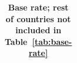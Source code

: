 {\begin{table}[ht]
{\begin{tabular}{lccccc}
        \bottomrule
        \end{tabular}
        }



        \caption{\textbf{Base rate; rest of countries not included in Table~\ref{tab:base-rate}}}
    \end{table}
}







